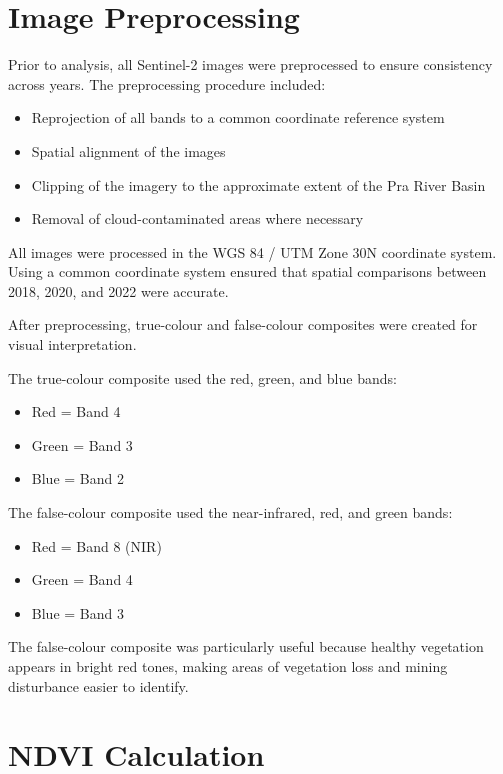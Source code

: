 \documentclass[a4paper,12pt]{report}
\begin{document}
\section{Image Preprocessing}

Prior to analysis, all Sentinel-2 images were preprocessed to ensure consistency across years. The preprocessing procedure included:

\begin{itemize}
\item Reprojection of all bands to a common coordinate reference system
\item Spatial alignment of the images
\item Clipping of the imagery to the approximate extent of the Pra River Basin
\item Removal of cloud-contaminated areas where necessary
\end{itemize}

All images were processed in the WGS 84 / UTM Zone 30N coordinate system. Using a common coordinate system ensured that spatial comparisons between 2018, 2020, and 2022 were accurate.

After preprocessing, true-colour and false-colour composites were created for visual interpretation.

The true-colour composite used the red, green, and blue bands:

\begin{itemize}
\item Red = Band 4
\item Green = Band 3
\item Blue = Band 2
\end{itemize}

The false-colour composite used the near-infrared, red, and green bands:

\begin{itemize}
\item Red = Band 8 (NIR)
\item Green = Band 4
\item Blue = Band 3
\end{itemize}

The false-colour composite was particularly useful because healthy vegetation appears in bright red tones, making areas of vegetation loss and mining disturbance easier to identify.


\section{NDVI Calculation}
\end{document}
